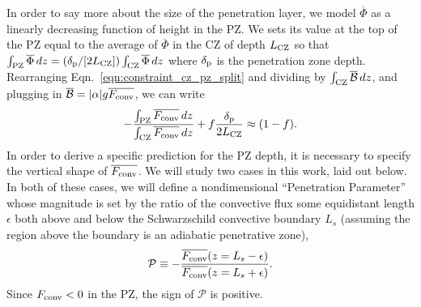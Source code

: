 \documentclass{aastex631}
\newcommand{\delp}{\ensuremath{\delta_{\rm{p}}}}
\newcommand{\Fconv}{\ensuremath{F_{\rm{conv}}}}
\newcommand{\mP}{\ensuremath{\mathcal{P}}}
\renewcommand{\bar}[1]{\overline{#1}}
\begin{document}
In order to say more about the size of the penetration layer, we model $\bar{\Phi}$ as a linearly decreasing function of height in the PZ.
We sets its value at the top of the PZ equal to the average of $\bar{\Phi}$ in the CZ of depth $L_{\rm{CZ}}$ so that $\int_{\rm{PZ}} \bar{\Phi}\,dz = (\delp/[2 L_{\rm{CZ}}])\int_{\rm{CZ}}\bar{\Phi}\,dz$ where $\delp$ is the penetration zone depth.
Rearranging Eqn.~\ref{eqn:constraint_cz_pz_split} and dividing by $\int_{\rm{CZ}} \bar{\mathcal{B}}\,dz$, and plugging in $\bar{\mathcal{B}} = |\alpha|g\bar{\Fconv}$, we can write
\begin{equation}
-\frac{\int_{\rm{PZ}}\bar{\Fconv}\,dz}{\int_{\rm{CZ}}\bar{\Fconv}\,dz} + f\frac{\delp}{2 L_{\rm{CZ}}}
\approx (1 - f).
\label{eqn:theory_fraction}
\end{equation}
In order to derive a specific prediction for the PZ depth, it is necessary to specify the vertical shape of $\overline{\Fconv}$.
We will study two cases in this work, laid out below.
In both of these cases, we will define a nondimensional ``Penetration Parameter'' whose magnitude is set by the ratio of the convective flux some equidistant length $\epsilon$ both above and below the Schwarzschild convective boundary $L_s$ (assuming the region above the boundary is an adiabatic penetrative zone),
\begin{equation}
\mP \equiv -\frac{\overline{\Fconv}(z = L_s - \epsilon)}{\overline{\Fconv}(z = L_s + \epsilon)}.
\label{eqn:theory_P_defn}
\end{equation}
Since $\Fconv < 0$ in the PZ, the sign of $\mP$ is positive.
\end{document}
